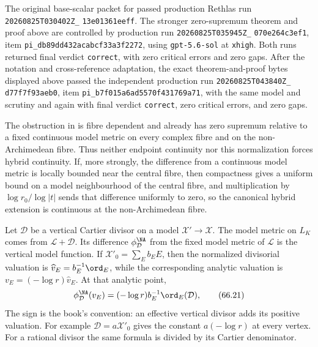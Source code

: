 The original base-scalar packet for
 passed production
Rethlas run \texttt{20260825T030402Z\_}\allowbreak
\texttt{13e01361eeff}.  The stronger zero-supremum theorem and proof above
are controlled by production run
\texttt{20260825T035945Z\_}\allowbreak
\texttt{070e264c3ef1}, item
\texttt{pi\_db89dd432acabcf33a3f2272}, using
\texttt{gpt-5.6-sol} at \texttt{xhigh}.  Both runs returned final verdict
\texttt{correct}, with zero critical errors and zero gaps.  After the
notation and cross-reference adaptation, the exact theorem-and-proof bytes
displayed above passed the independent production run
\texttt{20260825T043840Z\_}\allowbreak
\texttt{d77f7f93aeb0}, item
\texttt{pi\_b7f015a6ad5570f431769a71}, with the same model and scrutiny and
again with final verdict \texttt{correct}, zero critical errors, and zero
gaps.

\begin{remark}\label{rem:hybrid-extension-not-continuity}
The obstruction in  is fibre dependent and already has zero supremum relative to a fixed continuous model metric on every complex fibre and on the non-Archimedean fibre.  Thus neither endpoint continuity nor this normalization forces hybrid continuity.  If, more strongly, the difference from a continuous model metric is locally bounded near the central fibre, then compactness gives a uniform bound on a model neighbourhood of the central fibre, and multiplication by $\log r_0/\log|t|$ sends that difference uniformly to zero, so the canonical hybrid extension is continuous at the non-Archimedean fibre.
\end{remark}

\begin{example}
\label{ex:hybrid-model-metric}
Let $\mathcal D$ be a vertical Cartier divisor on a model $\mathcal X'\to\mathcal X$. The model metric on $L_K$ comes from $\mathcal L+\mathcal D$. Its difference $\phi_{\mathcal D}^{\NA}$ from the fixed model metric of $\mathcal L$ is the vertical model function. If $\mathcal X'_0=\sum_E b_EE$, then the normalized divisorial valuation is $\widehat v_E=b_E^{-1}\ord_E$, while the corresponding analytic valuation is $v_E=(-\log r)\widehat v_E$.  At that analytic point,
\[
             \phi_{\mathcal D}^{\NA}(v_E)
             =(-\log r)b_E^{-1}\ord_E(\mathcal D),
\tag{66.21}\label{eq:hybrid-model-value}
\]
The sign is the book's convention: an effective vertical divisor adds its positive valuation. For example $\mathcal D=a\mathcal X'_0$ gives the constant $a(-\log r)$ at every vertex. For a rational divisor the same formula is divided by its Cartier denominator.
\end{example}

